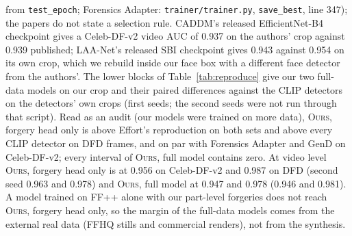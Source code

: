 \documentclass[10pt]{article}
\newcommand{\oursB}{\textsc{Ours}, forgery head only}
\newcommand{\oursF}{\textsc{Ours}, full model}
\begin{document}
from \texttt{test\_epoch}; Forensics Adapter: \texttt{trainer/trainer.py}, \texttt{save\_best}, line 347); the papers do not state a
selection rule. CADDM's released EfficientNet-B4 checkpoint gives a Celeb-DF-v2 video AUC of 0.937 on the authors' crop against
0.939 published; LAA-Net's released SBI checkpoint gives 0.943 against 0.954 on its own crop, which we rebuild inside our face
box with a different face detector from the authors'. The lower blocks of Table~\ref{tab:reproduce} give our two full-data
models on our crop and their paired differences against the CLIP detectors on the detectors' own crops (first seeds; the second
seeds were not run through that script). Read as an audit (our models were trained on more data), \oursB{} is above Effort's reproduction on both sets and above
every CLIP detector on DFD frames, and on
par with Forensics Adapter and GenD on Celeb-DF-v2; every interval of \oursF{} contains zero. At video
level \oursB{} is at 0.956 on Celeb-DF-v2 and 0.987 on DFD (second seed 0.963 and 0.978) and \oursF{} at 0.947 and 0.978 (0.946
and 0.981). A model trained on FF++ alone with our part-level forgeries does not reach \oursB{}, so the margin of the full-data
models comes from the external real data (FFHQ stills and commercial renders), not from the synthesis.
\end{document}
